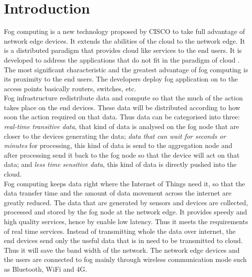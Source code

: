 \documentclass[10pt,a4paper,journal]{IEEEtran}
\begin{document}
\section{Introduction}
\hspace*{1em}Fog computing is a new technology proposed by CISCO to take full advantage of network edge devices. It extends the abilities of the cloud to the network edge. It is a distributed paradigm that provides cloud like services to the end users. It is developed to address the applications that do not fit in the paradigm of cloud \cite{1,2}. The most significant characteristic and the greatest advantage of fog computing is its proximity to the end users. The developers deploy fog application on to the access points basically routers, switches, etc.\\
\hspace*{2em} Fog infrastructure redistribute data and compute so that the much of the action takes place on the end devices. These data will be distributed according to how soon the action required on that data. Thus data can be categorised into three: \textit{real-time transitive data}, that kind of data is analysed on the fog node that are closer to the devices generating the data; \textit{data that can wait for seconds or minutes} for processing, this kind of data is send to the aggregation node and after processing send it back to the fog node so that the device will act on that data; and \textit{less time sensitive data}, this kind of data is directly pushed into the cloud.\\
\hspace*{2em}	 Fog computing keeps data right where the Internet of Things need it, so that the data transfer time and the amount of data movement across the internet are greatly reduced. The data that are generated by sensors and devices are collected, processed and stored by the fog node at the network edge. It provides speedy and high quality services, hence by enable low latency. Thus it meets the requirements of real time services. Instead of transmitting whole the data over internet, the end devices send only the useful data that is in need to be transmitted to cloud. Thus it will save the band width of the network. The network edge devices and the users are connected to fog mainly through wireless communication mode such as Bluetooth, WiFi and 4G.\\
\end{document}
